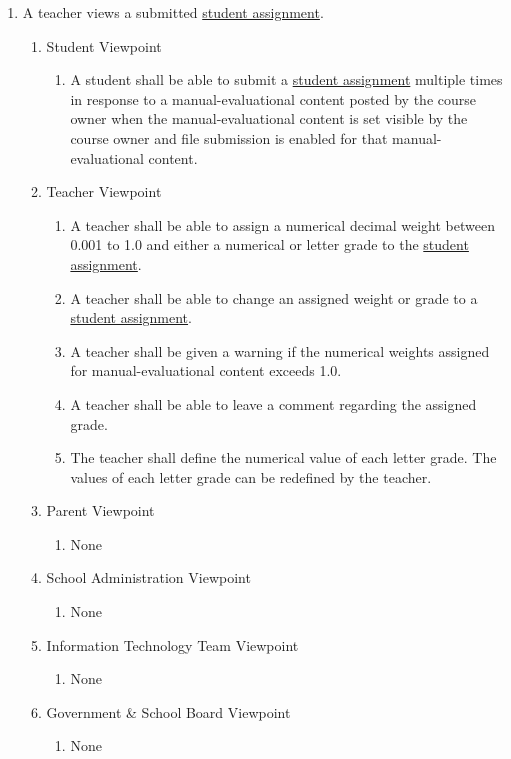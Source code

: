 \documentclass[]{article}
\begin{document}
\begin{enumerate}[{BE}1.]
	\item A teacher views a submitted \underline{student assignment}.
	\begin{enumerate}[{VP2}.1]
		\item Student Viewpoint
			\begin{enumerate}
				\item A student shall be able to submit a \underline{student assignment}
multiple times in response to a manual-evaluational content posted by the course
owner when the manual-evaluational content is set visible by the course
owner and file submission is enabled for that manual-evaluational content.
			\end{enumerate}
		\item Teacher Viewpoint
			\begin{enumerate}
				\item A teacher shall be able to assign a numerical decimal weight between
0.001 to 1.0 and either a numerical or letter grade to the \underline{student
assignment}.
				\item A teacher shall be able to change an assigned weight or grade to a
\underline{student assignment}.
				\item A teacher shall be given a warning if the numerical weights assigned
for
manual-evaluational content exceeds 1.0.
				\item A teacher shall be able to leave a comment regarding the assigned
grade.
				\item The teacher shall define the numerical value of each letter grade. The
values of each letter grade can be redefined by the teacher.
			\end{enumerate}
		\item Parent Viewpoint
			\begin{enumerate}
				\item None
			\end{enumerate}
		\item School Administration Viewpoint
			\begin{enumerate}
				\item None
			\end{enumerate}
		\item Information Technology Team Viewpoint
			\begin{enumerate}
				\item None
			\end{enumerate}
		\item Government \& School Board Viewpoint
			\begin{enumerate}
				\item None
			\end{enumerate}
	\end{enumerate}


\end{enumerate}
\end{document}
